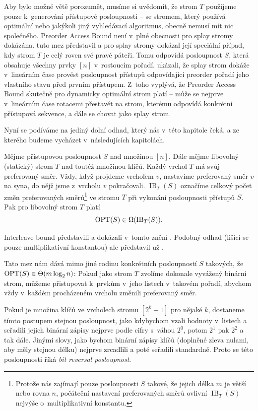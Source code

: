 Aby bylo možné větě porozumět, musíme si uvědomit, že strom $T$ použijeme pouze
k~generování přístupové posloupnosti -- se stromem, který používá optimální nebo
jakýkoli jiný vyhledávací algoritmus, obecně nemusí mít nic společného. Preorder
Access Bound není v~plné obecnosti pro splay stromy dokázána.
\citet{preordertarjan} tuto mez představil a pro splay stromy dokázal její
speciální případ, kdy strom $T$ je celý roven své pravé páteři. Tomu odpovídá
posloupnost $S$, která obsahuje všechny prvky $[n]$ v~rostoucím pořadí.
\citet{preordersplay} ukázali, že splay strom dokáže v~lineárním čase provést
posloupnost přístupů odpovídající preorder pořadí jeho vlastního stavu před prvním
přístupem. Z~toho vyplývá, že Preorder Access Bound skutečně pro dynamicky
optimální strom platí -- může se nejprve v~lineárním čase rotacemi přestavět na strom,
kterému odpovídá konkrétní přístupová sekvence, a dále se chovat jako splay
strom. 

Nyní se podíváme na jediný dolní odhad, který nás v~této kapitole čeká, a ze kterého budeme vycházet v~následujících kapitolách.

\def\ib{\operatorname{IB}}

\begin{veta}
Mějme přístupovou posloupnost $S$ nad množinou $[n]$. Dále mějme libovolný
(statický) strom $T$ nad toutéž množinou klíčů. Každý vrchol $T$ má svůj
preferovaný směr. Vždy, když projdeme vrcholem $v$, nastavíme preferovaný směr
$v$ na syna, do nějž jsme z~vrcholu $v$ pokračovali. $\ib_T(S)$ označíme
celkový počet změn preferovaných směrů\footnote{Protože nás zajímají pouze
posloupnosti $S$ takové, že jejich délka $m$ je větší nebo rovna $n$, počáteční
nastavení preferovaných směrů ovlivní $\ib_T(S)$ nejvýše o~multiplikativní
konstantu.} ve stromu $T$ při vykonání posloupnosti přístupů $S$. Pak pro
libovolný strom $T$ platí $$\opt(S) \in \Omega(\ib_T(S)).$$ 
\end{veta}

Interleave bound představili a dokázali v~tomto znění \citet{tango}. Podobný odhad (lišící se pouze multiplikativní konstantou) ale představil už \citet{interleave}.

Tato mez nám dává mimo jiné rodinu konkrétních posloupností $S$ takových, že
$\opt(S)\in\Theta(m\log n)$: Pokud jako strom $T$ zvolíme dokonale vyvážený
binární strom, můžeme přistupovat k~prvkům v~jeho listech v~takovém pořadí,
abychom vždy v~každém procházeném vrcholu změnili preferovaný směr.

Pokud je množina klíčů ve vrcholech stromu $[2^k-1]$ pro nějaké $k$, dostaneme
tímto postupem stejnou posloupnost, jako kdybychom vzali hodnoty v~listech a
seřadili jejich binární zápisy nejprve podle cifry s~váhou $2^0$, potom $2^1$
pak $2^2$ a tak dále. Jinými slovy, jako bychom binární zápisy klíčů (doplněné
zleva nulami, aby měly stejnou délku) nejprve zrcadlili a poté seřadili
standardně. Proto se této posloupnosti říká \emph{bit reversal posloupnost}.

